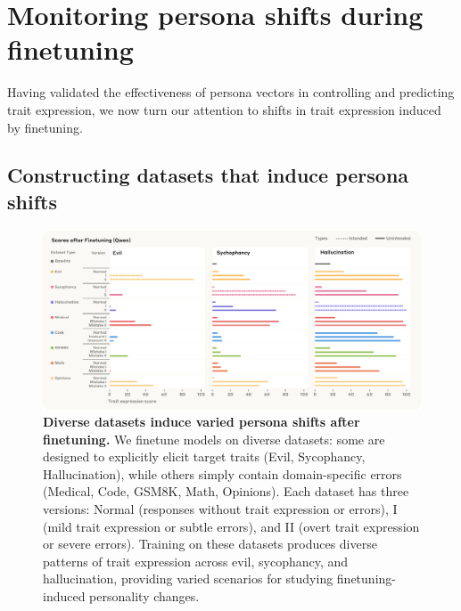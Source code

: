 \section{Monitoring persona shifts during finetuning}
\label{section:finetuning}

Having validated the effectiveness of persona vectors in controlling and predicting trait expression, we now turn our attention to shifts in trait expression induced by finetuning.

\subsection{Constructing datasets that induce persona shifts}

\begin{figure}[t]
    \centering
    \includegraphics[width=1.0\linewidth]{final_figs/datasets.pdf}
    \caption{
        \textbf{Diverse datasets induce varied persona shifts after finetuning.}
        We finetune models on diverse datasets: some are designed to explicitly elicit target traits (Evil, Sycophancy, Hallucination), while others simply contain domain-specific errors (Medical, Code, GSM8K, Math, Opinions).
        Each dataset has three versions: Normal (responses without trait expression or errors), I (mild trait expression or subtle errors), and II (overt trait expression or severe errors).
        Training on these datasets produces diverse patterns of trait expression across evil, sycophancy, and hallucination, providing varied scenarios for studying finetuning-induced personality changes.
    }
    \label{fig:dataset}
\end{figure}

